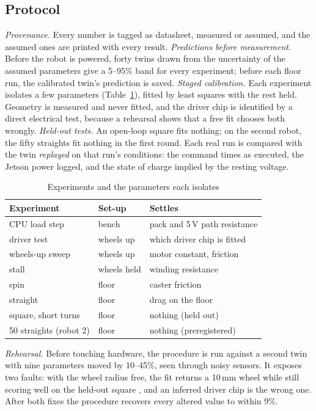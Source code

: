 \documentclass[conference,a4paper]{IEEEtran}
\begin{document}
\subsection{Protocol}
\emph{Provenance.} Every number is tagged as datasheet, measured or assumed,
and the assumed ones are printed with every result.
\emph{Predictions before measurement.} Before the robot is powered, forty
twins drawn from the uncertainty of the assumed parameters give a 5--95\%
band for every experiment; before each floor run, the calibrated twin's
prediction is saved.
\emph{Staged calibration.} Each experiment isolates a few parameters
(Table~\ref{tab:experiments}), fitted by least squares with the rest held.
Geometry is measured and never fitted, and the driver chip is identified by a
direct electrical test, because a rehearsal shows that a free fit chooses both
wrongly.
\emph{Held-out tests.} An open-loop square fits nothing; on the second robot,
the fifty straights fit nothing in the first round. Each real run is compared
with the twin \emph{replayed} on that run's conditions: the command times as
executed, the Jetson power logged, and the state of charge implied by the
resting voltage.

\begin{table}[t]
\caption{Experiments and the parameters each isolates}
\label{tab:experiments}
\centering\footnotesize
\begin{tabular}{@{}lll@{}}
\toprule
Experiment & Set-up & Settles \\
\midrule
CPU load step & bench & pack and 5\,V path resistance \\
driver test & wheels up & which driver chip is fitted \\
wheels-up sweep & wheels up & motor constant, friction \\
stall & wheels held & winding resistance \\
spin & floor & caster friction \\
straight & floor & drag on the floor \\
square, short turns & floor & nothing (held out) \\
50 straights (robot 2) & floor & nothing (preregistered) \\
\bottomrule
\end{tabular}
\end{table}

\emph{Rehearsal.} Before touching hardware, the procedure is run against a
second twin with nine parameters moved by 10--45\%, seen through noisy
sensors. It exposes two faults: with the wheel radius free, the fit returns a
10\,mm wheel while still scoring well on the held-out square
\citep{brynjarsdottir2014learning}, and an inferred driver chip is the wrong one.
After both fixes the procedure recovers every altered value to within 9\%.
\end{document}
